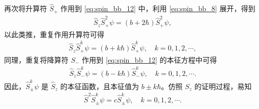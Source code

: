 再次将升算符 $\hat S_+$ 作用到 \eqref{eq:spin_bb_12} 中，利用 \eqref{eq:spin_bb_8} 展开，得到
\begin{align}
    \hat S_z \hat S_+^2 \psi = (b + 2\hbar) \hat S_+^2 \psi, 
\end{align}
以此类推，重复作用升算符可得
\begin{align}
    \hat S_z \hat S_+^k \psi = (b + k\hbar) \hat S_+^k \psi, \quad k = 0, 1, 2, \cdots, 
    \label{eq:spin_bb_13}
\end{align}
同理，重复将降算符 $S_-$ 作用到 \eqref{eq:spin_bb_12} 的本征方程中可得
\begin{align}
    \hat S_z \hat S_-^k \psi = (b-k\hbar) \hat S_-^k \psi, \quad k = 0, 1, 2, \cdots. 
\end{align}
因此，$\hat S_\pm^k \psi$ 是 $\hat S_z$ 的本征函数，且本征值为 $b\pm k\hbar$。仿照 $S_z$ 的证明过程，易知
\begin{align}
    \hat S^2 \hat S_\pm^k \psi = c \hat S_\pm^k \psi, \quad k=0,1,2,\cdots. 
    \label{eq:spin_bb_15}
\end{align}

